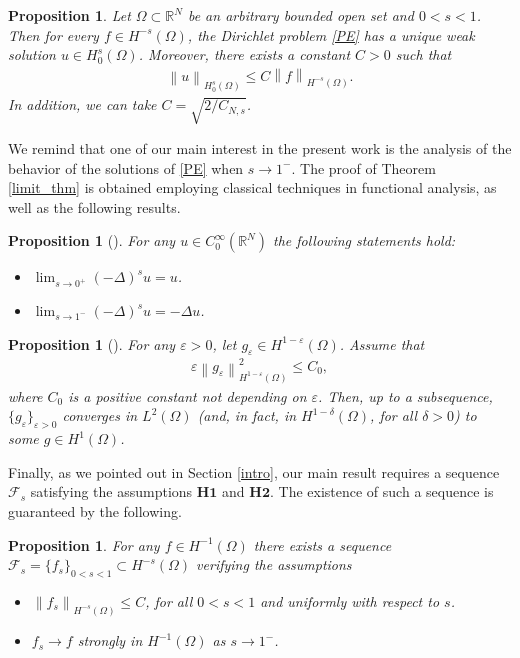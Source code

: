 \documentclass[reqno,twoside]{amsart}
\newtheorem{proposition}[theorem]{Proposition}
\numberwithin{equation}{section}
\def\RR{{\mathbb{R}}}
\newcommand{\norm}[2]{{\left\|#1\right\|}_{#2}}
\newcommand{\fl}[2]{(-\Delta)^#1#2}
\newcommand{\cns}{C_{N,s}}
\begin{document}
\begin{proposition}\label{prop-ex}
Let $\Omega\subset\RR^N$ be an arbitrary bounded open set and $0<s<1$. Then for every $f\in H^{-s}(\Omega)$, the Dirichlet problem \eqref{PE} has a unique weak solution $u\in H_0^s(\Omega)$. Moreover, there exists a constant $C>0$ such that
\begin{align}\label{est-sol}
	\norm{u}{H_0^s(\Omega)}\le C\norm{f}{H^{-s}(\Omega)}.
\end{align}
In addition, we can take $C=\sqrt{2/\cns}$. 
\end{proposition}

We remind that one of our main interest in the present work is the analysis of the behavior of the solutions of \eqref{PE} when $s\to 1^-$. The proof of Theorem \ref{limit_thm} is obtained employing classical techniques in functional analysis, as well as the following results.

\begin{proposition}[{\cite[Proposition 4.4]{dihitchhiker}}]\label{limit_prop}
For any $u\in C_0^\infty(\RR^N)$ the following statements hold:
\begin{itemize}
	\item[(i)] $\lim_{s\to 0^+}\fl{s}{u} = u$.
	\item[(ii)] $\lim_{s\to 1^-} \fl{s}{u} = -\Delta u$.
\end{itemize}
\end{proposition}

\begin{proposition}[{\cite[Corollary 7]{bourgain2001another}}]\label{brezis_prop}
For any $\varepsilon>0$, let $g_\varepsilon \in H^{1-\varepsilon}(\Omega)$. Assume that 
\begin{align*}
	\varepsilon\norm{g_\varepsilon}{H^{1-\varepsilon}(\Omega)}^2\leq C_0,
\end{align*}
where $C_0$ is a positive constant not depending on $\varepsilon$. Then, up to a subsequence, $\{g_\varepsilon\}_{\varepsilon>0}$ converges in $L^2(\Omega)$ (and, in fact, in $H^{1-\delta}(\Omega)$, for all $\delta > 0$) to some $g\in H^1(\Omega)$.
\end{proposition}

Finally, as we pointed out in Section \ref{intro}, our main result requires a sequence $\mathcal{F}_s$ satisfying the assumptions $\textbf{H1}$ and $\textbf{H2}$. The existence of such a sequence is guaranteed by the following.

\begin{proposition}\label{limit_f}
	For any $f\in H^{-1}(\Omega)$ there exists a sequence $\mathcal{F}_s=\{f_s\}_{0<s<1}\subset H^{-s}(\Omega)$ verifying the assumptions
	\begin{itemize}
		\item[$\textbf{H1}$] $\norm{f_s}{H^{-s}(\Omega)}\leq C$, for all $0<s<1$ and uniformly with respect to $s$.
		
		\item[$\widehat{\textbf{H2}}$] $f_s\to f$ strongly in $H^{-1}(\Omega)$ as $s\to 1^-$.
	\end{itemize}		
\end{proposition}
\end{document}
